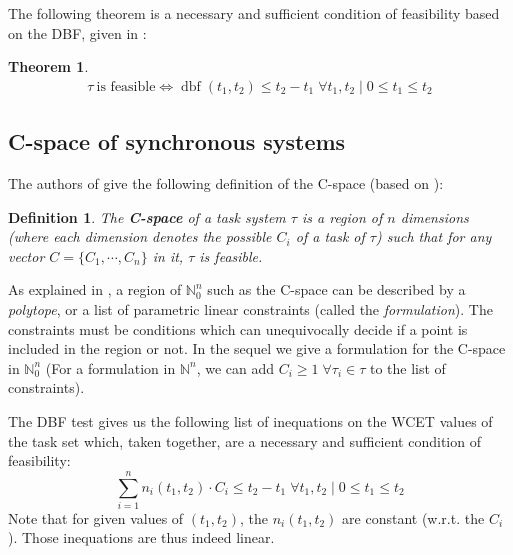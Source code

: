 \documentclass[conference]{IEEEtran}
\newtheorem{theorem}{Theorem}
\newtheorem{definition}{Definition}
\newcommand{\dbf}[1]{\operatorname{dbf}(#1)}
\begin{document}
		The following theorem is a necessary and sufficient condition of feasibility
		based on the DBF, given in \cite{baruah1999generalized}:
		\begin{theorem}
			\begin{equation*}
				\begin{array}{c}
					\tau \: \text{is feasible}  \iff
					\dbf{t_1, t_2} \leqslant t_2 - t_1 \; \forall t_1, t_2 \mid  0 \leq t_1 \leq t_2
				\end{array}
			\end{equation*}
		\end{theorem}

	\subsection{C-space of synchronous systems}
	\label{sct:cspaceDescr}

			The authors of \cite{george2009characterization} give the following definition of the C-space (based on \cite{bini2004schedulability}):
			\begin{definition}
				The \textbf{C-space} of a task system $\tau$ is a region of $n$ dimensions (where each dimension denotes the possible $C_i$ of a task of $\tau$) such that for any vector $C = \{ C_1, \cdots, C_{n}\}$ in it, $\tau$ is feasible.
			\end{definition}

			As explained in \cite{nemhauser1988integer}, a region of $\mathbb{N}_0^n$
			such as the C-space can be described by a \emph{polytope}, or a list of
			parametric linear constraints (called the \emph{formulation}). The
			constraints must be conditions which can unequivocally decide if a point is
			included in the region or not. In the sequel we give a formulation for the
			C-space in $\mathbb{N}_0^n$ (For a formulation in $\mathbb{N}^n$, we can add
			$C_i \geqslant 1 \; \forall \tau_i \in \tau$ to the list of constraints).

		The DBF test gives us the following list of inequations on the WCET values of the task set
		which, taken together, are a necessary and sufficient condition of feasibility:
		\begin{equation}
			\sum_{i=1}^{n}  n_i(t_1, t_2) \cdot C_i \leq t_2 - t_1 \; \forall t_1,t_2 \mid 0 \leq t_1 \leq t_2
		\end{equation}
		Note that for given values  of $(t_1, t_2)$, the $n_i(t_1, t_2)$ are
		constant (w.r.t. the $C_i$). Those inequations are thus indeed linear.
\end{document}
